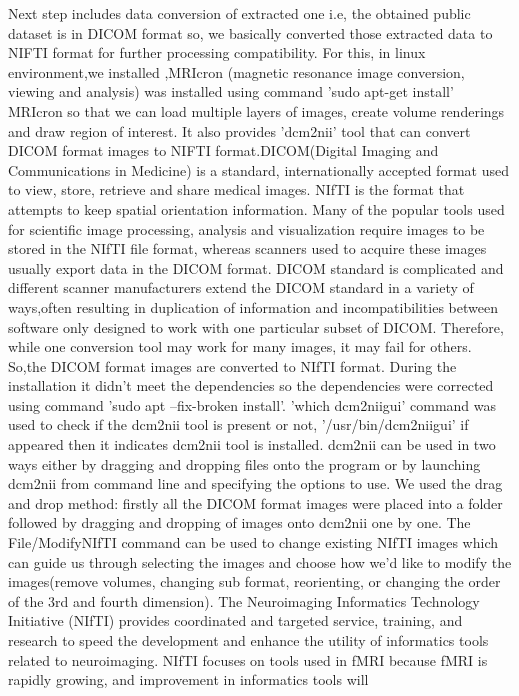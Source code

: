 \documentclass{article}
\begin{document}
Next step includes data conversion of extracted one i.e, the obtained
public dataset is in DICOM format so, we basically converted those
extracted data to NIFTI format for further processing compatibility.
For this, in linux environment,we installed ,MRIcron (magnetic
resonance image conversion, viewing and analysis) was installed using
command 'sudo apt-get install' MRIcron so that we can load multiple
layers of images, create volume renderings and draw region of
interest. It also provides 'dcm2nii' tool that can convert DICOM
format images to NIFTI format.DICOM(Digital Imaging and Communications
in Medicine) is a standard, internationally accepted format used to
view, store, retrieve and share medical images. NIfTI is the format
that attempts to keep spatial orientation information. Many of the
popular tools used for scientific image processing, analysis and
visualization require images to be stored in the NIfTI file format,
whereas scanners used to acquire these images usually export data in
the DICOM format. DICOM standard is complicated and different scanner
manufacturers extend the DICOM standard in a variety of ways,often
resulting in duplication of information and incompatibilities between
software only designed to work with one particular subset of DICOM.
Therefore, while one conversion tool may work for many images, it may
fail for others. So,the DICOM format images are converted to NIfTI
format. During the installation it didn't meet the dependencies so
the dependencies were corrected using command 'sudo apt --fix-broken
install'. 'which dcm2niigui' command was used to check if the dcm2nii
tool is present or not, '/usr/bin/dcm2niigui' if appeared then it
indicates dcm2nii tool is installed. dcm2nii can be used in two ways
either by dragging and dropping files onto the program or by launching
dcm2nii from command line and specifying the options to use. We used
the drag and drop method: firstly all the DICOM format images were
placed into a folder followed by dragging and dropping of images onto
dcm2nii one by one. The File/ModifyNIfTI command can be used to change
existing NIfTI images which can guide us through selecting the images
and choose how we'd like to modify the images(remove volumes, changing
sub format, reorienting, or changing the order of the 3rd and fourth
dimension). The Neuroimaging Informatics Technology Initiative (NIfTI)
provides coordinated and targeted service, training, and research to
speed the development and enhance the utility of informatics tools
related to neuroimaging. NIfTI focuses on tools used in fMRI because
fMRI is rapidly growing, and improvement in informatics tools will
\end{document}

